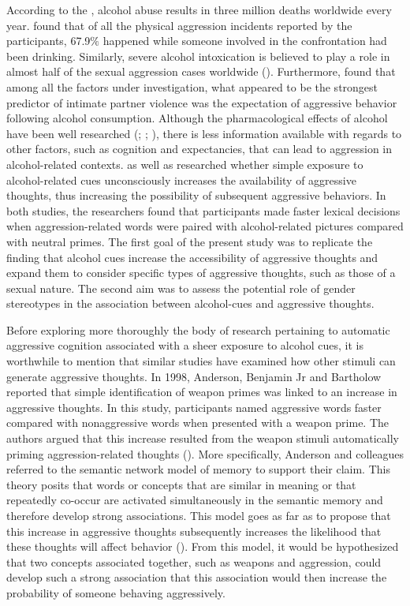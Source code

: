 \documentclass[serif, twocolumn, numeric, empirical]{jote-article}
\begin{document}
According to the \textcite{Organization}, alcohol abuse results in three million deaths worldwide every year. \textcite{WellsGrahamWest2000} found that of all the physical aggression incidents reported by the participants, 67.9$\%$  happened while someone involved in the confrontation had been drinking. Similarly, severe alcohol intoxication is believed to play a role in almost half of the sexual aggression cases worldwide (\cite{Testa2002}). Furthermore, \textcite{FieldCaetanoNelson2004} found that among all the factors under investigation, what appeared to be the strongest predictor of intimate partner violence was the expectation of aggressive behavior following alcohol consumption. Although the pharmacological effects of alcohol have been well researched (\cite{ChermackTaylor1995}; \cite{Giancola2000}; \cite{HeinzBeckMeyerLindenbergSterzerHeinz2011}), there is less information available with regards to other factors, such as cognition and expectancies, that can lead to aggression in alcohol-related contexts. \textcite{BartholowHeinz2006} as well as \textcite{SubraMullerBegueLBushmanDelmas2010} researched whether simple exposure to alcohol-related cues unconsciously increases the availability of aggressive thoughts, thus increasing the possibility of subsequent aggressive behaviors. In both studies, the researchers found that participants made faster lexical decisions when aggression-related words were paired with alcohol-related pictures compared with neutral primes. The first goal of the present study was to replicate the finding that alcohol cues increase the accessibility of aggressive thoughts and expand them to consider specific types of aggressive thoughts, such as those of a sexual nature. The second aim was to assess the potential role of gender stereotypes in the association between alcohol-cues and aggressive thoughts.

Before exploring more thoroughly the body of research pertaining to automatic aggressive cognition associated with a sheer exposure to alcohol cues, it is worthwhile to mention that similar studies have examined how other stimuli can generate aggressive thoughts. In 1998, Anderson, Benjamin Jr and Bartholow reported that simple identification of weapon primes was linked to an increase in aggressive thoughts. In this study, participants named aggressive words faster compared with nonaggressive words when presented with a weapon prime. The authors argued that this increase resulted from the weapon stimuli automatically priming aggression-related thoughts (\cite{AndersonJrJBartholow1998}). More specifically, Anderson and colleagues referred to the semantic network model of memory to support their claim. This theory posits that words or concepts that are similar in meaning or that repeatedly co-occur are activated simultaneously in the semantic memory and therefore develop strong associations. This model goes as far as to propose that this increase in aggressive thoughts subsequently increases the likelihood that these thoughts will affect behavior (\cite{BartholowHeinz2006}). From this model, it would be hypothesized that two concepts associated together, such as weapons and aggression, could develop such a strong association that this association would then increase the probability of someone behaving aggressively. 
\end{document}
